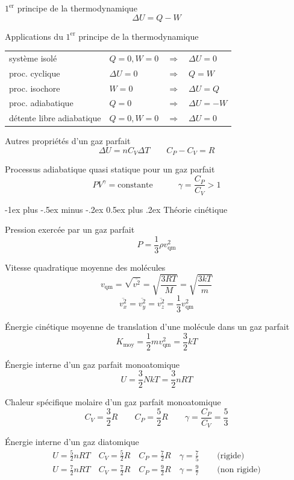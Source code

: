 \documentclass[10pt,landscape]{article}
\makeatletter
\renewcommand{\section}{\@startsection{section}{1}{0mm}%
                                {-1ex plus -.5ex minus -.2ex}%
                                {0.5ex plus .2ex}%
                                {\normalfont\large\bfseries}}
\newcommand{\halfline}{\vspace{0.5em}}
\newcommand{\tableindent}{\hspace{1.5em}}
\makeatother
\begin{document}
\begin{multicols}{3}
$1^\text{er}$ principe de la thermodynamique
\[ \Delta U = Q - W \]

Applications du $1^\text{er}$ principe de la thermodynamique \\
\begin{tabular}{@{\tableindent}m{24mm}<{\raggedright}p{18mm}<{\raggedright}cl}
	système isolé & $Q=0, W=0$ &$\Longrightarrow$ & $\Delta U = 0$ \\
	proc. cyclique & $\Delta U = 0$ &$\Longrightarrow$ & $Q=W$ \\
	proc. isochore & $W=0$ &$\Longrightarrow$ & $\Delta U = Q$ \\
	proc. adiabatique & $Q=0$ &$\Longrightarrow$ & $\Delta U = -W$ \\
	détente libre adiabatique & 
		$Q=0, W=0$ %
		&$\Longrightarrow$ & $\Delta U = 0$ \\
\end{tabular}
\halfline

Autres propriétés d'un gaz parfait
\[ \Delta U = n C_V \Delta T  
\qquad 
C_P - C_V = R
\]

Processus adiabatique quasi statique pour un gaz parfait
\[ PV^\gamma = \text{constante} \qquad\quad \gamma = \frac{C_P}{C_V} > 1 \]

\hrulefill

\section{Théorie cinétique}

Pression exercée par un gaz parfait
\[ P = \frac{1}{3} \rho v^2_\text{qm} \]

Vitesse quadratique moyenne des molécules
\[ v_\text{qm} = \sqrt{\overline{v^2}}
= \sqrt{\frac{3RT}{M}} 
= \sqrt{\frac{3kT}{m}} \]
\[ \overline{v^2_x} =  \overline{v^2_y} = \overline{v^2_z} = \frac{1}{3} v^2_\text{qm}  \]

Énergie cinétique moyenne de translation d'une molécule dans un gaz parfait
\[ K_\text{moy} = \frac{1}{2} mv^2_\text{qm} = \frac{3}{2} kT \]

Énergie interne d'un gaz parfait monoatomique
\[ U = \frac{3}{2} NkT = \frac{3}{2} nRT \]

Chaleur spécifique molaire d'un gaz parfait monoatomique
\[ C_V = \frac{3}{2} R 
\qquad
C_P = \frac{5}{2} R
\qquad 
\gamma = \frac{C_P}{C_V} = \frac{5}{3} \]

Énergie interne d'un gaz diatomique
\begin{align*}
	U = \frac{5}{2} nRT \quad 
	C_V = \frac{5}{2} R  \quad 
	C_P = \frac{7}{2} R  \quad
	\gamma = \frac{7}{5} \quad &\text{ (rigide)} \\
	U = \frac{7}{2} nRT \quad 
	C_V = \frac{7}{2} R \quad 
	C_P = \frac{9}{2} R  \quad
	\gamma = \frac{9}{7} \quad &\text{ (non rigide)}
\end{align*}


\end{multicols}
\end{document}
